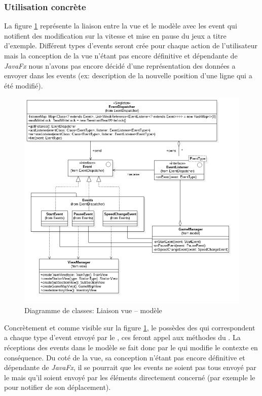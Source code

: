 \documentclass[report, backcover, french, nodocumentinfo]{upmethodology-document}
\begin{document}
			\subsubsection{Utilisation concrète}
				\p{}
					La figure \ref{fig:ViewModelLinkClassDiagram} représente la liaison entre la vue et le modèle avec les event qui notifient des modification sur la vitesse et mise en pause du jeux a titre d'exemple. Différent types d'events seront crée pour chaque action de l'utilisateur mais la conception de la vue n'étant pas encore définitive et dépendante de \textit{JavaFx} nous n'avons pas encore décidé d'une représentation des données a envoyer dans les events (ex: description de la nouvelle position d'une ligne qui a été modifié).
					\begin{figure}[h!]
						\centering
						\includegraphics[width=\textwidth]{figures/ViewModelLinkClassDiagram}
						\caption{Diagramme de classes: Liaison vue -- modèle}
						\label{fig:ViewModelLinkClassDiagram}
					\end{figure}
				\p{}
					Concrètement et comme visible sur la figure \ref{fig:ViewModelLinkClassDiagram}, le  possèdes des  qui correspondent a chaque type d'event envoyé par le , ces  feront appel aux méthodes  du . La réceptions des events dans le modèle se fait donc par le  qui modifie le contexte en conséquence. Du coté de la vue, sa conception n'étant pas encore définitive et dépendante de \textit{JavaFx}, il se pourrait que les events ne soient pas tous envoyé par le  mais qu'il soient envoyé par les éléments directement concerné (par exemple le  pour notifier de son déplacement).
\end{document}
